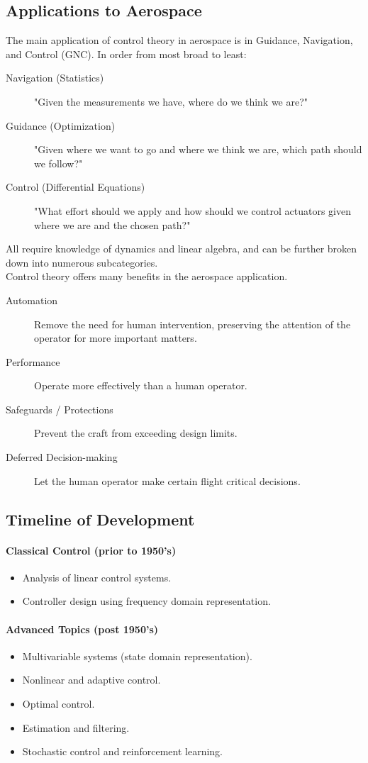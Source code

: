 \documentclass[../notes.tex]{subfiles}
\begin{document}
\subsection{Applications to Aerospace}
The main application of control theory in aerospace is in Guidance, Navigation, and Control (GNC). In order from most broad to least:
\begin{description}
    \item[Navigation (Statistics)] "Given the measurements we have, where do we think we are?"
    \item[Guidance (Optimization)] "Given where we want to go and where we think we are, which path should we follow?"
    \item[Control (Differential Equations)] "What effort should we apply and how should we control actuators given where we are and the chosen path?"
\end{description}
All require knowledge of dynamics and linear algebra, and can be further broken down into numerous subcategories.\\ 
Control theory offers many benefits in the aerospace application. 
\begin{description}
    \item[Automation] Remove the need for human intervention, preserving the attention of the operator for more important matters.
    \item[Performance] Operate more effectively than a human operator.
    \item[Safeguards / Protections] Prevent the craft from exceeding design limits.
    \item[Deferred Decision-making] Let the human operator make certain flight critical decisions.
\end{description}

\subsection{Timeline of Development}
\paragraph{Classical Control (prior to 1950's)}
\begin{itemize}
    \item Analysis of linear control systems.
    \item Controller design using frequency domain representation.
\end{itemize}
\paragraph{Advanced Topics (post 1950's)}
\begin{itemize}
    \item Multivariable systems (state domain representation).
    \item Nonlinear and adaptive control.
    \item Optimal control.
    \item Estimation and filtering.
    \item Stochastic control and reinforcement learning.
\end{itemize}
\end{document}
